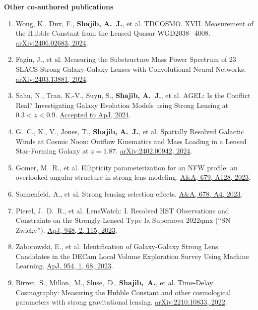 \documentclass[margin, line]{res}
\begin{document}
\begin{resume}
\textbf{Other co-authored publications}
\begin{enumerate}
	\item Wong, K., Dux, F., \textbf{Shajib, A.~J.}, et al. TDCOSMO. XVII. Measurement of the Hubble Constant from the Lensed Quasar WGD2038$-$4008. \href{https://ui.adsabs.harvard.edu/abs/2024arXiv240602683W/abstract}{arXiv:2406.02683, 2024}.
	\item Fagin, J., et al. Measuring the Substructure Mass Power Spectrum of 23 SLACS Strong Galaxy-Galaxy Lenses with Convolutional Neural Networks. \href{https://ui.adsabs.harvard.edu/abs/2024arXiv240313881F/abstract}{arXiv:2403.13881, 2024}.
	\item Sahu, N., Tran, K.-V., Suyu, S., \textbf{Shajib, A.~J.}, et al. AGEL: Is the Conflict Real? Investigating Galaxy Evolution Models using Strong Lensing at $0.3 < z < 0.9$. \href{https://ui.adsabs.harvard.edu/abs/2024arXiv240515427S/abstract}{Accepted to ApJ, 2024}.
	\item G.~C., K., V., Jones, T., \textbf{Shajib, A.~J.}, et al. Spatially Resolved Galactic Winds at Cosmic Noon: Outflow Kinematics and Mass Loading in a Lensed Star-Forming Galaxy at $z=1.87$. \href{https://arxiv.org/abs/2402.00942}{arXiv:2402.00942, 2024}.
	\item Gomer, M.~R., et al. Ellipticity parameterization for an NFW profile: an overlooked angular structure in strong lens modeling. \href{https://ui.adsabs.harvard.edu/abs/2023A\%26A...679A.128G/abstract}{A\&A, 679, A128, 2023}.
	\item Sonnenfeld, A., et al. Strong lensing selection effects. \href{https://ui.adsabs.harvard.edu/abs/2023A\%26A...678A...4S/abstract}{A\&A, 678, A4, 2023}.
	\item Pierel, J.~D.~R., et al. LensWatch: I. Resolved HST Observations and Constraints on the Strongly-Lensed Type Ia Supernova 2022qmx (``SN Zwicky'').  \href{https://ui.adsabs.harvard.edu/abs/2023ApJ...948..115P/abstract}{ApJ, 948, 2, 115, 2023}.
	\item Zaborowski, E., et al. Identification of Galaxy-Galaxy Strong Lens Candidates in the DECam Local Volume Exploration Survey Using Machine Learning. \href{https://ui.adsabs.harvard.edu/abs/2023ApJ...954...68Z/abstract}{ApJ, 954, 1, 68, 2023}.
	\item Birrer,~S., Millon,~M., Sluse,~D., \textbf{Shajib,~A.}, et al. Time-Delay Cosmography: Measuring the Hubble Constant and other cosmological parameters with strong gravitational lensing. \href{https://arxiv.org/abs/2210.10833}{arXiv:2210.10833, 2022}.

\end{enumerate}
\end{resume}
\end{document}

